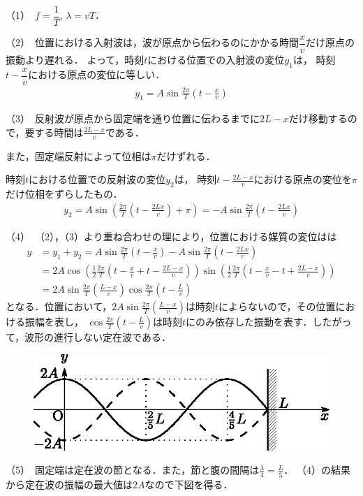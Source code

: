 \setcounter{eqNo}{0}
\setcounter{figure}{0}

\noindent （1）\,
$f=\dfrac{1}{T},\,\lambda =vT$．


\noindent （2）\,
位置\x における入射波は，波が原点から伝わるのにかかる時間$\dfrac{x}{v}$だけ原点の振動より遅れる．
よって，時刻$t$における位置\x での入射波の変位$y_1$は，
時刻$t-\dfrac{x}{v}$における原点の変位に等しい．
\begin{align*}
  y_1 = A \sin \frac{2\pi}{T}\left(t-\frac{x}{v}\right)
\end{align*}

\noindent （3）\,
反射波が原点から固定端を通り位置\x に伝わるまでに$2L-x$だけ移動するので，要する時間は$\frac{2L-x}{v}$である．

また，固定端反射によって位相は$\pi$だけずれる．

時刻$t$における位置\x での反射波の変位$y_2$は，
時刻$t-\frac{2L-x}{v}$における原点の変位を$\pi$だけ位相をずらしたもの．
\begin{align*}
  y_2 = A \sin \left(\frac{2\pi}{T}\left(t-\frac{2Lx}{v}\right)+\pi\right) = -A\sin\frac{2\pi}{T}\left(t-\frac{2Lx}{v}\right)
\end{align*}

\noindent （4）\,
（2），（3）より重ね合わせの理により，位置\x における媒質の変位は\y は
\begin{align*}
  y &= y_1+y_2 
  = A \sin \frac{2\pi}{T}\left(t-\frac{x}{v}\right)
  - A \sin \frac{2\pi}{T}\left(t-\frac{2Lx}{v}\right) \\
  &= 2A \cos\left(\frac{1}{2}\frac{2\pi}{T}\left(t-\frac{x}{v}+t-\frac{2L-x}{v}\right)\right)\sin\left(\frac{1}{2}\frac{2\pi}{T}\left(t-\frac{x}{v}-t+\frac{2L-x}{v}\right)\right) \\
  &= 2A\sin \frac{2\pi}{T}\left(\frac{L-x}{v}\right) \cos \frac{2\pi}{T}\left(t-\frac{L}{v}\right)
\end{align*}
となる．位置\x において，$2A\sin \frac{2\pi}{T}\left(\frac{L-x}{v}\right)$は時刻$t$によらないので，その位置における振幅を表し，
$\cos \frac{2\pi}{T}\left(t-\frac{L}{v}\right)$は時刻$t$にのみ依存した振動を表す．したがって，波形の進行しない定在波である．



{
\begin{figure}
  \vspace{-\intextsep}
  \includegraphics[width=.4\columnwidth]{../graphs/jumon_75_sol.eps}
\end{figure}
\noindent （5）\,
固定端は定在波の節となる．また，節と腹の間隔は$\frac{\lambda}{4}=\frac{L}{5}$．
（4）の結果から定在波の振幅の最大値は$2A$なので下図を得る．


\par}

